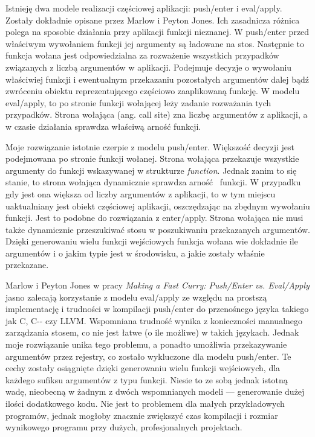 \documentclass[declaration,shortabstract]{iithesis}
\begin{document}
Istnieję dwa modele realizacji częściowej aplikacji: push/enter i eval/apply. 
Zostały dokładnie opisane przez Marlow i Peyton Jones\cite{fast_curry}. 
Ich zasadnicza różnica polega na sposobie działania przy aplikacji funkcji 
nieznanej. W push/enter przed właściwym wywołaniem funkcji jej argumenty są 
ładowane na stos. Następnie to funkcja wołana jest odpowiedzialna za
rozważenie wszystkich przypadków związanych z liczbą argumentów w aplikacji.
Podejmuje decyzje o wywołaniu właściwiej funkcji i ewentualnym przekazaniu 
pozostałych argumentów dalej bądź zwróceniu obiektu reprezentującego częściowo
zaaplikowaną funkcję. W modelu eval/apply, to po stronie funkcji wołającej 
leży zadanie rozważania tych przypadków. Strona wołająca (ang. call site)
zna liczbę argumentów z aplikacji, a w czasie działania sprawdza 
właściwą arność funkcji. 

Moje rozwiązanie istotnie czerpie z modelu push/enter. Większość decyzji
jest podejmowana po stronie funkcji wołanej. Strona wołająca przekazuje 
wszystkie argumenty do funkcji wskazywanej w strukturze \textit{function}. 
Jednak zanim to się stanie, to strona wołająca dynamicznie sprawdza arność 
funkcji. W przypadku gdy jest ona większa od liczby argumentów z aplikacji, 
to w tym miejscu uaktualniany jest obiekt częściowej aplikacji, oszczędzając 
na zbędnym wywołaniu funkcji. Jest to podobne do rozwiązania z enter/apply.
Strona wołająca nie musi także dynamicznie przeszukiwać stosu w poszukiwaniu 
przekazanych argumentów. Dzięki generowaniu wielu funkcji wejściowych funkcja 
wołana wie dokładnie ile argumentów i o jakim typie jest w środowisku, a jakie 
zostały właśnie przekazane. 

Marlow i Peyton Jones w pracy \textit{Making a Fast Curry: Push/Enter vs.
Eval/Apply} jasno zalecają korzystanie z modelu eval/apply ze względu na 
prostszą implementację i trudności w kompilacji push/enter do przenośnego 
języka takiego jak C, C-{}- czy LLVM. Wspomniana trudność wynika z 
konieczności manualnego zarządzania stosem, co nie jest łatwe (o ile możliwe) 
w takich językach. Jednak moje rozwiązanie unika tego problemu, a ponadto
umożliwia przekazywanie argumentów przez rejestry, co zostało wykluczone dla 
modelu push/enter. Te cechy zostały osiągnięte dzięki generowaniu wielu funkcji 
wejściowych, dla każdego sufiksu argumentów z typu funkcji. Niesie to ze sobą 
jednak istotną wadę, nieobecną w żadnym z dwóch wspomnianych modeli --- 
generowanie dużej ilości dodatkowego kodu. Nie jest to problemem dla małych 
przykładowych programów, jednak mogłoby znacznie zwiększyć czas kompilacji i 
rozmiar wynikowego programu przy dużych, profesjonalnych projektach.
\end{document}

